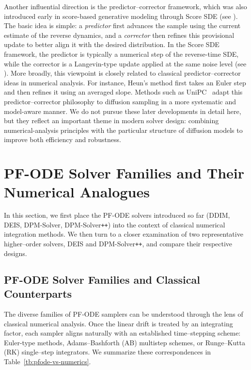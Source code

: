Another influential direction is the predictor--corrector framework, which was also introduced early in score-based generative modeling through Score SDE (see ). The basic idea is simple: a \emph{predictor} first advances the sample using the current estimate of the reverse dynamics, and a \emph{corrector} then refines this provisional update to better align it with the desired distribution. In the Score SDE framework, the predictor is typically a numerical step of the reverse-time SDE, while the corrector is a Langevin-type update applied at the same noise level (see ). More broadly, this viewpoint is closely related to classical predictor--corrector ideas in numerical analysis. For instance, Heun's method first takes an Euler step and then refines it using an averaged slope. Methods such as UniPC~\citep{zhao2023unipc} adapt this predictor--corrector philosophy to diffusion sampling in a more systematic and model-aware manner. We do not pursue these later developments in detail here, but they reflect an important theme in modern solver design: combining numerical-analysis principles with the particular structure of diffusion models to improve both efficiency and robustness.

\newpage

\section{PF-ODE Solver Families and Their Numerical Analogues}\label{sec:summary-solver}

In this section, we first place the PF-ODE solvers introduced so far (DDIM, DEIS, DPM-Solver, DPM-Solver\texttt{++}) into the context of 
classical numerical integration methods.  We then turn to a closer examination of two representative higher–order solvers, DEIS and DPM-Solver\texttt{++}, and  compare their respective designs.

\subsection{PF-ODE Solver Families and Classical Counterparts}

The diverse families of PF-ODE samplers can be understood through the lens of
classical numerical analysis. Once the linear drift is treated by an integrating
factor, each sampler aligns naturally with an established time–stepping scheme:
Euler-type methods, Adams–Bashforth (AB) multistep schemes, or Runge–Kutta (RK)
single–step integrators.  We summarize these correspondences in
Table~\ref{tb:pfode-vs-numerics}.


